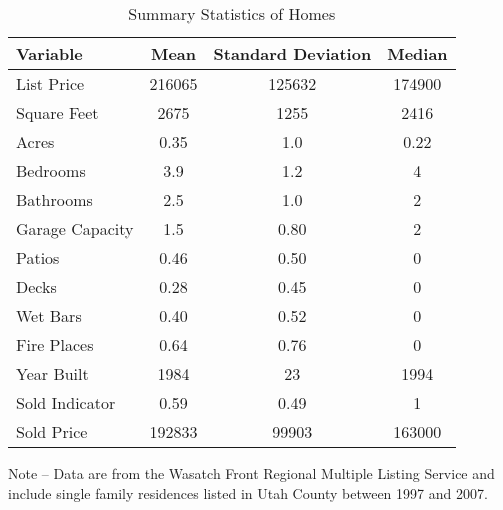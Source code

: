\documentclass[12pt]{article}
\begin{document}
\begin{table}[ht]
    \begin{center}
    \caption{Summary Statistics of Homes}
    \begin{tabular}{@{}lccc@{}} \toprule
        Variable        & Mean      & Standard Deviation    & Median \\ \midrule
        List Price      & 216065    & 125632                & 174900 \\
        Square Feet     & 2675      & 1255                  & 2416 \\
        Acres           & 0.35      & 1.0                   & 0.22 \\
        Bedrooms        & 3.9       & 1.2                   & 4 \\
        Bathrooms       & 2.5       & 1.0                   & 2 \\
        Garage Capacity & 1.5       & 0.80                  & 2 \\
        Patios          & 0.46      & 0.50                  & 0 \\
        Decks           & 0.28      & 0.45                  & 0 \\
        Wet Bars        & 0.40      & 0.52                  & 0 \\
        Fire Places     & 0.64      & 0.76                  & 0 \\
        Year Built      & 1984      & 23                    & 1994 \\
        Sold Indicator  & 0.59      & 0.49                  & 1 \\
        Sold Price      & 192833    & 99903                 & 163000 \\ \bottomrule
    \end{tabular}
    \begin{minipage}{.88\hsize}
    {\footnotesize Note -- Data are from the Wasatch Front Regional Multiple Listing Service and include single family residences listed in Utah County between 1997 and 2007.}
    \end{minipage}
    \end{center}
\end{table}
\end{document}
